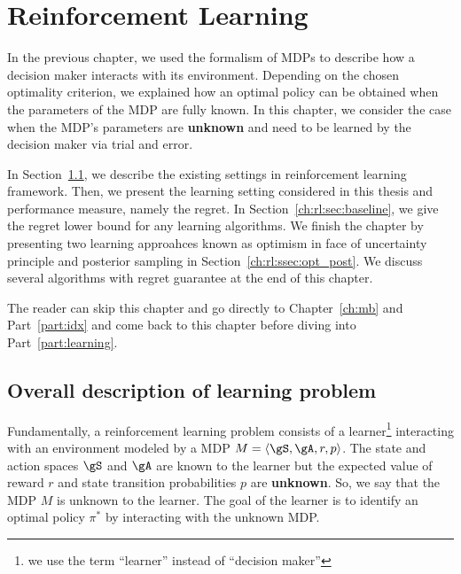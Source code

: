 \begingroup

\let\clearpage\relax

\chapter{Reinforcement Learning}
\label{ch:rl}

In the previous chapter, we used the formalism of MDPs to describe how a decision maker interacts with its environment.
Depending on the chosen optimality criterion, we explained how an optimal policy can be obtained when the parameters of the MDP are fully known.
In this chapter, we consider the case when the MDP's parameters are \textbf{unknown} and need to be learned by the decision maker via trial and error.


In Section~\ref{ch:rl:sec:overal}, we describe the existing settings in reinforcement learning framework.
Then, we present the learning setting considered in this thesis and performance measure, namely the regret. 
In Section~\ref{ch:rl:sec:baseline}, we give the regret lower bound for any learning algorithms.
We finish the chapter by presenting two learning approahces known as optimism in face of uncertainty principle and posterior sampling in Section~\ref{ch:rl:ssec:opt_post}.
We discuss several algorithms with regret guarantee at the end of this chapter.

The reader can skip this chapter and go directly to Chapter~\ref{ch:mb} and Part~\ref{part:idx} and come back to this chapter before diving into Part~\ref{part:learning}.

\section{Overall description of learning problem}
\label{ch:rl:sec:overal}

Fundamentally, a reinforcement learning problem consists of a learner\footnote{we use the term ``learner'' instead of ``decision maker''} interacting with an environment modeled by a MDP $M=\langle\gS,\gA,r,p\rangle$.
The state and action spaces $\gS$ and $\gA$ are known to the learner but the expected value of reward $r$ and state transition probabilities $p$ are \textbf{unknown}.
So, we say that the MDP $M$ is unknown to the learner.
The goal of the learner is to identify an optimal policy $\pi^*$ by interacting with the unknown MDP.


